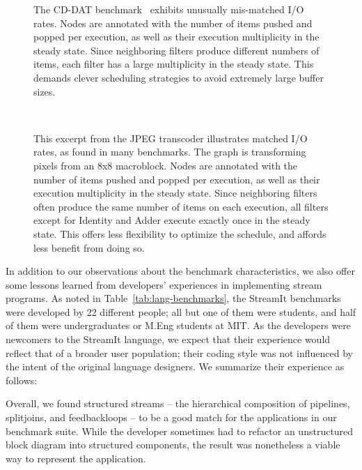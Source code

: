 \begin{figure}[t!]
\centering
{}
\vspace{-6pt}
\caption[CD-DAT, an example of mismatched I/O rates.]{The CD-DAT
  benchmark~\cite{murthy_buffer_2004} exhibits unusually mis-matched
  I/O rates.  Nodes are annotated with the number of items pushed and
  popped per execution, as well as their execution multiplicity in the
  steady state. Since neighboring filters produce different numbers of
  items, each filter has a large multiplicity in the steady state.
  This demands clever scheduling strategies to avoid extremely large
  buffer sizes.\protect\label{fig:cd-dat}}
~ \\
\vspace{-6pt}
\caption[JPEG transcoder excerpt, an example of matched I/O rates.]{This 
excerpt from the JPEG transcoder illustrates matched I/O rates, as
found in many benchmarks.  The graph is transforming pixels from an
8x8 macroblock.  Nodes are annotated with the number of items pushed
and popped per execution, as well as their execution multiplicity in
the steady state.  Since neighboring filters often produce the same
number of items on each execution, all filters except for Identity and
Adder execute exactly once in the steady state.  This offers less
flexibility to optimize the schedule, and affords less benefit from
doing so.
\protect\label{fig:jpeg}}
\vspace{-24pt}
\end{figure}

\myend

\enlargethispage{0.3\baselineskip}
In addition to our observations about the benchmark characteristics,
we also offer some lessons learned from developers' experiences in
implementing stream programs.  As noted in
Table~\ref{tab:lang-benchmarks}, the StreamIt benchmarks were
developed by 22 different people; all but one of them were students,
and half of them were undergraduates or M.Eng students at MIT.  As the
developers were newcomers to the StreamIt language, we expect that
their experience would reflect that of a broader user population;
their coding style was not influenced by the intent of the original
language designers.  We summarize their experience as follows:

\mybegin

  Overall, we found structured streams --
  the hierarchical composition of pipelines, splitjoins, and
  feedbackloops -- to be a good match for the applications in our
  benchmark suite.  While the developer sometimes had to refactor an
  unstructured block diagram into structured components, the result
  was nonetheless a viable way to represent the application.

